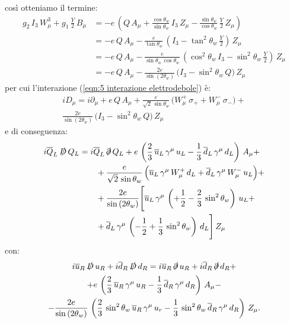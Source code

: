 così otteniamo il termine:
\begin{align}
    g_2\, I_3\, W_\mu^3 + g_1\, \frac{Y}{2}\, B_\mu &= -e\, \left( Q\, A_\mu + \frac{\cos\theta_w}{\sin\theta_w}\, I_3\, Z_\mu - \frac{\sin\theta_w}{\cos\theta_w}\, \frac{Y}{2}\, Z_\mu \right) \\
    &= -e\, Q\, A_\mu - \frac{e}{\tan\theta_w}\, \left(I_3 - \tan^2\theta_w\, \frac{Y}{2}\right)\, Z_\mu \\
    &= -e\, Q\, A_\mu - \frac{e}{\sin\theta_w\, \cos\theta_w}\, \left(\cos^2\theta_w\, I_3 - \sin^2\theta_w\, \frac{Y}{2}\right)\, Z_\mu \\
    &= -e\, Q\, A_\mu - \frac{2e}{\sin{(2\theta_w)}}\, \Big( I_3 - \sin^2\theta_w\, Q \Big)\, Z_\mu
\end{align}
per cui l'interazione (\ref{eqn:5 interazione elettrodebole}) è:
\begin{multline}
    iD_\mu = i\partial_\mu + e\, Q\, A_\mu + \frac{e}{\sqrt{2}\, \sin\theta_w}\, \Big( W_\mu^+\, \sigma_+ + W_\mu^-\, \sigma_- \Big) + \\
    \frac{2e}{\sin{(2\theta_w)}}\, \Big( I_3 - \sin^2\theta_w\, Q \Big)\, Z_\mu
\end{multline}
e di conseguenza:
\begin{align}
    i\overline{Q}_L\, \slashed{D}\, Q_L &= i\overline{Q}_L\, \slashed{\partial}\, Q_L + e\, \left( \frac{2}{3}\, \overline{u}_L\, \gamma^\mu\, u_L - \frac{1}{3}\, \overline{d}_L\, \gamma^\mu\, d_L \right)\, A_\mu + \notag \\
    &\qquad + \frac{e}{\sqrt{2}\, \sin\theta_w}\, \Big( \overline{u}_L\, \gamma^\mu\, W_\mu^+\, d_L + \overline{d}_L\, \gamma^\mu\, W_\mu^-\, u_L \Big) + \notag \\
    &\qquad + \frac{2e}{\sin{(2\theta_w)}}\Bigg[ \overline{u}_L\, \gamma^\mu\, \left(+\frac{1}{2} - \frac{2}{3}\, \sin^2\theta_w\right)\, u_L + \notag \\
    &\qquad + \overline{d}_L\, \gamma^\mu\, \left( -\frac{1}{2} + \frac{1}{3}\, \sin^2\theta_w \right)\, d_L \Bigg]\, Z_\mu
\end{align}
con:
\begin{multline}
    i\overline{u}_R\, \slashed{D}\, u_R + i\overline{d}_R\, \slashed{D}\, d_R = i\overline{u}_R\, \slashed{\partial}\, u_R + i\overline{d}_R\, \slashed{\partial}\, d_R + \\
    + e\, \left( \frac{2}{3}\, \overline{u}_R\, \gamma^\mu\, u_R - \frac{1}{3}\, \overline{d}_R\, \gamma^\mu\, d_R \right)\, A_\mu - \\
    - \frac{2e}{\sin{(2\theta_w)}}\, \left( \frac{2}{3}\, \sin^2\theta_w\, \overline{u}_R\, \gamma^\mu\, u_r - \frac{1}{3}\, \sin^2\theta_w\, \overline{d}_R\, \gamma^\mu\, d_R \right)\, Z_\mu.
\end{multline}
